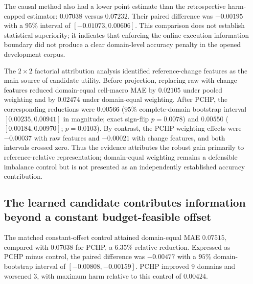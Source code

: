 \documentclass[preprint,12pt]{elsarticle}
\begin{document}
The causal method also had a lower point estimate than the retrospective harm-capped estimator: $0.07038$ versus $0.07232$. Their paired difference was $-0.00195$ with a $95\%$ interval of $[-0.01073,0.00606]$. This comparison does not establish statistical superiority; it indicates that enforcing the online-execution information boundary did not produce a clear domain-level accuracy penalty in the opened development corpus.

The $2\times2$ factorial attribution analysis identified reference-change features as the main source of candidate utility. Before projection, replacing raw with change features reduced domain-equal cell-macro MAE by $0.02105$ under pooled weighting and by $0.02474$ under domain-equal weighting. After PCHP, the corresponding reductions were $0.00566$ ($95\%$ complete-domain bootstrap interval $[0.00235,0.00941]$ in magnitude; exact sign-flip $p=0.0078$) and $0.00550$ ($[0.00184,0.00970]$; $p=0.0103$). By contrast, the PCHP weighting effects were $-0.00037$ with raw features and $-0.00021$ with change features, and both intervals crossed zero. Thus the evidence attributes the robust gain primarily to reference-relative representation; domain-equal weighting remains a defensible imbalance control but is not presented as an independently established accuracy contribution.

\subsection{The learned candidate contributes information beyond a constant budget-feasible offset}

The matched constant-offset control attained domain-equal MAE $0.07515$, compared with $0.07038$ for PCHP, a $6.35\%$ relative reduction. Expressed as PCHP minus control, the paired difference was $-0.00477$ with a $95\%$ domain-bootstrap interval of $[-0.00808,-0.00159]$. PCHP improved $9$ domains and worsened $3$, with maximum harm relative to this control of $0.00424$.
\end{document}
